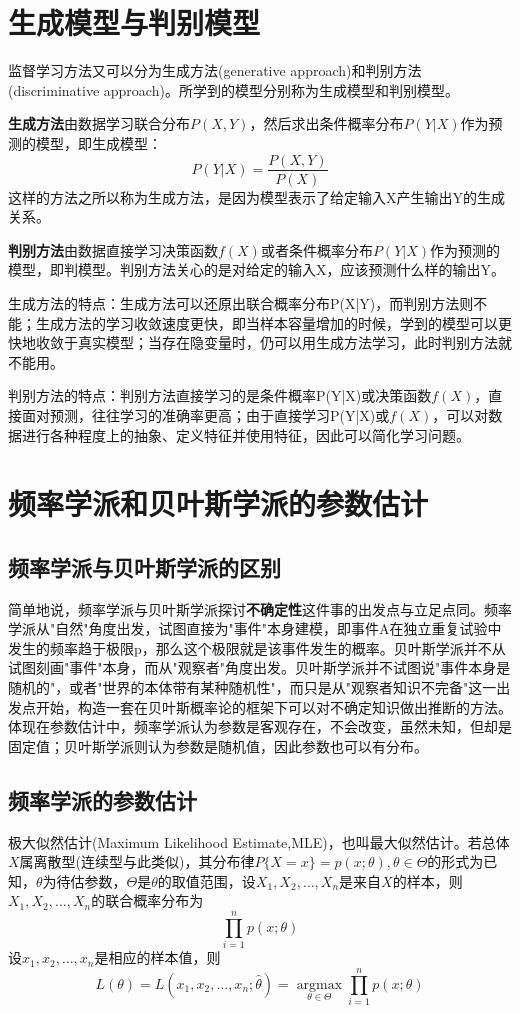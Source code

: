 \section{生成模型与判别模型}
监督学习方法又可以分为生成方法(generative approach)和判别方法(discriminative approach)。所学到的模型分别称为生成模型和判别模型。

\textbf{生成方法}由数据学习联合分布$P(X,Y)$，然后求出条件概率分布$P(Y|X)$作为预测的模型，即生成模型：
\begin{equation}
	P(Y|X) = \frac{P(X,Y)}{P(X)}
\end{equation}
这样的方法之所以称为生成方法，是因为模型表示了给定输入X产生输出Y的生成关系。

\textbf{判别方法}由数据直接学习决策函数$f(X)$或者条件概率分布$P(Y|X)$作为预测的模型，即判模型。判别方法关心的是对给定的输入X，应该预测什么样的输出Y。

生成方法的特点：生成方法可以还原出联合概率分布P(X|Y)，而判别方法则不能；生成方法的学习收敛速度更快，即当样本容量增加的时候，学到的模型可以更快地收敛于真实模型；当存在隐变量时，仍可以用生成方法学习，此时判别方法就不能用。

判别方法的特点：判别方法直接学习的是条件概率P(Y|X)或决策函数$f(X)$，直接面对预测，往往学习的准确率更高；由于直接学习P(Y|X)或$f(X)$，可以对数据进行各种程度上的抽象、定义特征并使用特征，因此可以简化学习问题。

\section{频率学派和贝叶斯学派的参数估计}
\subsection*{频率学派与贝叶斯学派的区别}
简单地说，频率学派与贝叶斯学派探讨\textbf{不确定性}这件事的出发点与立足点同。频率学派从"自然"角度出发，试图直接为"事件"本身建模，即事件A在独立重复试验中发生的频率趋于极限p，那么这个极限就是该事件发生的概率。贝叶斯学派并不从试图刻画"事件"本身，而从"观察者"角度出发。贝叶斯学派并不试图说"事件本身是随机的"，或者"世界的本体带有某种随机性"，而只是从"观察者知识不完备"这一出发点开始，构造一套在贝叶斯概率论的框架下可以对不确定知识做出推断的方法。体现在参数估计中，频率学派认为参数是客观存在，不会改变，虽然未知，但却是固定值；贝叶斯学派则认为参数是随机值，因此参数也可以有分布。
\subsection*{频率学派的参数估计}
极大似然估计(Maximum Likelihood Estimate,MLE)，也叫最大似然估计。若总体$X$属离散型(连续型与此类似)，其分布律$P\{X=x\}=p(x;\theta),\theta\in \Theta$的形式为已知，$\theta$为待估参数，$\Theta$是$\theta$的取值范围，设$X_1,X_2,\dots,X_n$是来自$X$的样本，则$X_1,X_2,\dots,X_n$的联合概率分布为
\begin{equation}
	\prod_{i=1}^{n}p(x;\theta)
\end{equation}
设$x_1,x_2,\dots,x_n$是相应的样本值，则
\begin{equation}
	L(\theta)=L(x_1,x_2,\dots,x_n;\hat{\theta})=\mathop{argmax}\limits_{\theta\in\Theta}\prod_{i=1}^{n}p(x;\theta)
\end{equation}
